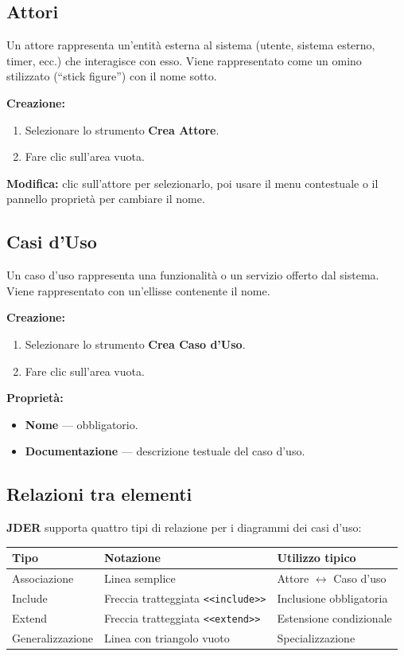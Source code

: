 \documentclass[a4paper,11pt]{article}
\newcommand{\uielement}[1]{\textbf{#1}}
\newcommand{\jder}{\textbf{JDER}}
\begin{document}
\subsection{Attori}

Un attore rappresenta un'entità esterna al sistema (utente, sistema esterno, timer, ecc.)
che interagisce con esso. Viene rappresentato come un omino stilizzato (``stick figure'') con il
nome sotto.

\textbf{Creazione:}
\begin{enumerate}
  \item Selezionare lo strumento \uielement{Crea Attore}.
  \item Fare clic sull'area vuota.
\end{enumerate}

\textbf{Modifica:} clic sull'attore per selezionarlo, poi usare il menu contestuale
o il pannello proprietà per cambiare il nome.

\subsection{Casi d'Uso}

Un caso d'uso rappresenta una funzionalità o un servizio offerto dal sistema. Viene rappresentato
con un'ellisse contenente il nome.

\textbf{Creazione:}
\begin{enumerate}
  \item Selezionare lo strumento \uielement{Crea Caso d'Uso}.
  \item Fare clic sull'area vuota.
\end{enumerate}

\textbf{Proprietà:}
\begin{itemize}
  \item \textbf{Nome} --- obbligatorio.
  \item \textbf{Documentazione} --- descrizione testuale del caso d'uso.
\end{itemize}

\subsection{Relazioni tra elementi}

\jder{} supporta quattro tipi di relazione per i diagrammi dei casi d'uso:

\begin{center}
\begin{tabular}{@{}lll@{}}
  \toprule
  \textbf{Tipo} & \textbf{Notazione} & \textbf{Utilizzo tipico} \\
  \midrule
  Associazione     & Linea semplice                  & Attore $\leftrightarrow$ Caso d'uso \\
  Include          & Freccia tratteggiata \texttt{<<include>>} & Inclusione obbligatoria \\
  Extend           & Freccia tratteggiata \texttt{<<extend>>}  & Estensione condizionale \\
  Generalizzazione & Linea con triangolo vuoto        & Specializzazione \\
  \bottomrule
\end{tabular}
\end{center}
\end{document}

